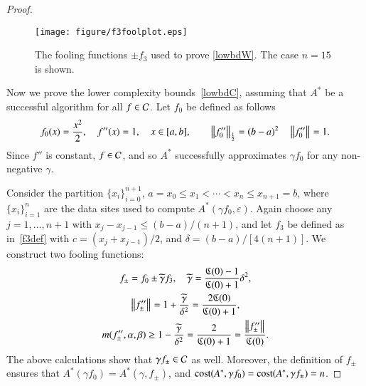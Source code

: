 \documentclass[review]{elsarticle}
\newcommand{\abstol}{\varepsilon}
\theoremstyle{definition}
\newcommand{\tgamma}{\widetilde{\gamma}}
\begin{document}
\begin{proof}
\begin{figure}
	\centering
	\texttt{[image: figure/f3foolplot.eps]}
	\caption{The fooling functions $\pm f_3$ used to prove \eqref{lowbdW}. The case
	$n=15$ is shown.}
	\label{f3foolplot}
\end{figure}
	
Now we prove the lower complexity bounds~\eqref{lowbdC}, assuming that $A^*$ be a successful algorithm for all $f  \in \mathcal{C}$.  Let $f_0$ be defined as follows
\begin{equation}
\label{assumpfzero}
f_0(x) =\frac{x^2}{2}, \quad f''(x) = 1, \quad x \in [a,b], \qquad \norm[\frac12]{f_0''} = (b -a)^2  \quad \norm{f_0''} = 1.
\end{equation}
Since $f''$ is constant, $f \in \mathcal{C}$, and so $A^*$ successfully approximates $\gamma f_0$ for any non-negative $\gamma$.

Consider the partition $\{x_i\}_{i=0}^{n+1}$, $a=x_0 \le x_1 < \cdots < x_n \le x_{n+1} = b$, where $\{x_i\}_{i=1}^n$ are the data sites used to compute  $A^*(\gamma f_0,\abstol)$.    Again choose any $j=1, \ldots, n+1$ with $x_j-x_{j-1} \le (b-a)/(n+1)$, and let $f_3$ be defined as in~\eqref{f3def} with $c = (x_j+x_{j-1})/2$, and $\delta  = (b-a)/[4(n+1)]$. We construct two fooling functions:
\begin{gather*}
f_{\pm} = f_0 \pm \tgamma f_3, \quad \tgamma =\frac{\fC(0)-1}{\fC(0)+1}\delta^2, \\
\norm{f''_{\pm}} = 1+\frac{\tgamma}{\delta^2} = \frac{2\fC(0)}{\fC(0)+1} , \\
m(f''_{\pm},\alpha,\beta) \ge 1-\frac{\tgamma}{\delta^2} = \frac{2}{\fC(0)+1} = \frac{\norm{f''_{\pm}} }{\fC(0)}.
\end{gather*}
The above calculations show that $\gamma f_{\pm} \in \mathcal{C}$ as well.  Moreover, the definition of $f_{\pm}$ ensures that
$A^*(\gamma f_0) = A^*(\gamma,f_{\pm})$, and $\operatorname{cost}(A^*,\gamma f_0) = \operatorname{cost}(A^*,\gamma f_{\pm}) = n$.


\end{proof}
\end{document}
